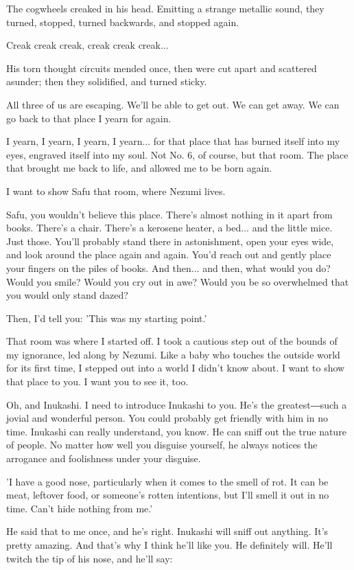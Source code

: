The cogwheels creaked in his head. Emitting a strange metallic sound,
they turned, stopped, turned backwards, and stopped again.

Creak creak creak, creak creak creak...

His torn thought circuits mended once, then were cut apart and scattered
asunder; then they solidified, and turned sticky.

All three of us are escaping. We'll be able to get out. We can get away.
We can go back to that place I yearn for again.

I yearn, I yearn, I yearn, I yearn... for that place that has burned
itself into my eyes, engraved itself into my soul. Not No. 6, of course,
but that room. The place that brought me back to life, and allowed me to
be born again.

I want to show Safu that room, where Nezumi lives.

Safu, you wouldn't believe this place. There's almost nothing in it
apart from books. There's a chair. There's a kerosene heater, a bed...
and the little mice. Just those. You'll probably stand there in
astonishment, open your eyes wide, and look around the place again and
again. You'd reach out and gently place your fingers on the piles of
books. And then... and then, what would you do? Would you smile? Would
you cry out in awe? Would you be so overwhelmed that you would only
stand dazed?

Then, I'd tell you: 'This was my starting point.'

That room was where I started off. I took a cautious step out of the
bounds of my ignorance, led along by Nezumi. Like a baby who touches the
outside world for its first time, I stepped out into a world I didn't
know about. I want to show that place to you. I want you to see it, too.

Oh, and Inukashi. I need to introduce Inukashi to you. He's the
greatest―such a jovial and wonderful person. You could probably get
friendly with him in no time. Inukashi can really understand, you know.
He can sniff out the true nature of people. No matter how well you
disguise yourself, he always notices the arrogance and foolishness under
your disguise.

'I have a good nose, particularly when it comes to the smell of rot. It
can be meat, leftover food, or someone's rotten intentions, but I'll
smell it out in no time. Can't hide nothing from me.'

He said that to me once, and he's right. Inukashi will sniff out
anything. It's pretty amazing. And that's why I think he'll like you. He
definitely will. He'll twitch the tip of his nose, and he'll say:

